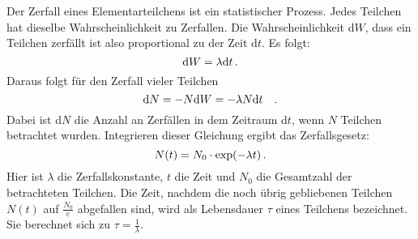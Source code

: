         Der Zerfall eines Elementarteilchens ist ein statistischer Prozess. Jedes Teilchen hat dieselbe Wahrscheinlichkeit zu Zerfallen.
        Die Wahrscheinlichkeit d$W$, dass ein Teilchen zerfällt ist also proportional zu der Zeit d$t$. Es folgt:
        \begin{equation}
            \text{d}W = \lambda\text{d}t \, .
        \end{equation}
        Daraus folgt für den Zerfall vieler Teilchen
        \begin{equation}
            \text{d}N = -N\text{d}W = -\lambda N \text{d}t \quad .
        \end{equation}
       Dabei ist d$N$ die Anzahl an Zerfällen in dem Zeitraum d$t$, wenn $N$ Teilchen betrachtet wurden.
       Integrieren dieser Gleichung ergibt das Zerfallsgesetz:
       \begin{equation}
           N(t) = N_0 \cdot \text{exp}(-\lambda t)\, .
       \end{equation}
       Hier ist $\lambda$ die Zerfallskonstante, $t$ die Zeit und $N_0$ die Gesamtzahl der betrachteten Teilchen. 
       Die Zeit, nachdem die noch übrig gebliebenen Teilchen $N(t)$ auf $\frac{N_0}{e}$ abgefallen sind, 
       wird als Lebensdauer $\tau$ eines Teilchens bezeichnet. Sie berechnet sich zu $\tau = \frac{1}{\lambda}$.





